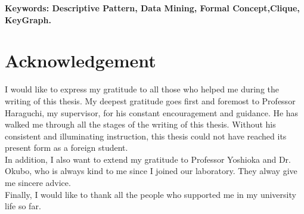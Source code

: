 \documentclass[12pt,oneside,a4paper]{report}
\begin{document}

\newpage


\begin{abstract}
Law plays a very important role in our humans' lives, at the present time, People always would like to use the law to protect their rights. Although we know old precedents is very helpful for new cases, there is also a fact that precedents are very long and very difficult to understand for our laymen. It is also not an easy work for specialists to find similar points among numbers of old precedents in a short time. In this paper, we proposed a method to extract similar parts of different precedents using the concept of descriptive patterns among multiple domains based on similarity classes of individual constants.

\end{abstract}

\textbf{\large Keywords: Descriptive Pattern, Data Mining, Formal Concept,Clique, KeyGraph. }
\tableofcontents
























\newpage
\section*{Acknowledgement}
I would like to express my gratitude to all those who helped me during the writing of this thesis. My deepest gratitude goes first and foremost to Professor Haraguchi, my supervisor, for his constant encouragement and guidance. He has walked me through all the stages of the writing of this thesis. Without his consistent and illuminating instruction, this thesis could not have reached its present form as a foreign student.\\
In addition, I also want to extend my gratitude to Professor Yoshioka and Dr. Okubo, who is always kind to me since I joined our laboratory. They alway give me sincere advice.\\
Finally, I would like to thank all the people who supported me in my university life so far.

\end{document}
